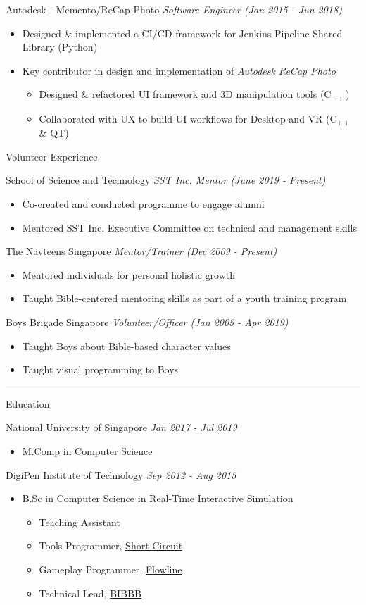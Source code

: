 \documentclass[letterpaper,11pt]{article}
\newcommand{\cvtitle}[1]{\huge\raggedright \textcolor{section_color}{#1}\\}
\newcommand{\cvhead}[1]{\large\raggedright \textcolor{subsection_color}{#1}\\}
\newcommand{\cvlist}[1]{\vspace{-12pt}\small \textcolor{item_color}{\begin{itemize}#1\end{itemize}}}
\newcommand{\cvli}[1]{\vspace{-4pt} \item{#1}}
\newcommand{\cvline}[0]{\noindent\rule{19cm}{0.4pt}}
\newcommand{\link}[2]{\textcolor{link_color}{\href{#1}{#2}}}
\newcommand{\qualifier}[1]{\hfill \textsl{\footnotesize #1}}
\begin{document}
\cvhead{Autodesk - Memento/ReCap Photo \qualifier{Software Engineer (Jan 2015 - Jun 2018)}}
\cvlist{
    \cvli{Designed \& implemented a CI/CD framework for Jenkins Pipeline Shared Library (Python)}
    \cvli{Key contributor in design and implementation of \textit{Autodesk ReCap Photo}
        \vspace{12pt}
        \cvlist{
            \cvli{Designed \& refactored UI framework and 3D manipulation tools (C$_{++}$)}
            \cvli{Collaborated with UX to build UI workflows for Desktop and VR (C$_{++}$ \& QT)}
        }
    }
}

\cvtitle{Volunteer Experience}

\cvhead{School of Science and Technology \qualifier{SST Inc. Mentor (June 2019 - Present)}}
\cvlist{
    \cvli{Co-created and conducted programme to engage alumni}
    \cvli{Mentored SST Inc. Executive Committee on technical and management skills}
}

\cvhead{The Navteens Singapore \qualifier{Mentor/Trainer (Dec 2009 - Present)}}
\cvlist{
    \cvli{Mentored individuals for personal holistic growth}
    \cvli{Taught Bible-centered mentoring skills as part of a youth training program}
}

\cvhead{Boys Brigade Singapore \qualifier{Volunteer/Officer (Jan 2005 - Apr 2019)}}
\cvlist{
    \cvli{Taught Boys about Bible-based character values}
    \cvli{Taught visual programming to Boys}
}

\vspace{-12pt}

\cvline

\cvtitle{Education}
\cvhead{National University of Singapore \qualifier{Jan 2017 - Jul 2019}}
\cvlist{
    \cvli{
        \cvhead{M.Comp in Computer Science}
    }
}

\cvhead{DigiPen Institute of Technology \qualifier{Sep 2012 - Aug 2015}}
\cvlist{
    \cvli{
        \cvhead{B.Sc in Computer Science in Real-Time Interactive Simulation}
        \cvlist{
            \cvli{Teaching Assistant}
            \cvli{Tools Programmer, \link{http://games.digipen.edu/games/shortcircuit}{Short Circuit}}
            \cvli{Gameplay Programmer, \link{http://games.digipen.edu/games/flowline}{Flowline}}
            \cvli{Technical Lead, \link{http://games.digipen.edu/games/bibbb}{BIBBB}}
        }
    }
}
\end{document}
